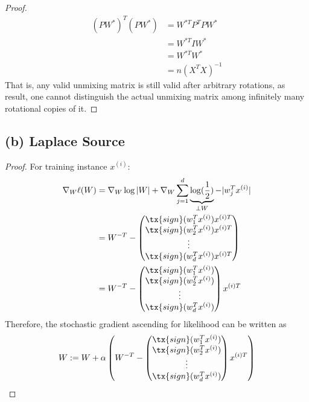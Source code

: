 \documentclass[11pt]{article}
\newcommand{\upi}[0]{^{(i)}}
\begin{document}
\begin{proof}
		\begin{align}
			(P W^*)^T (P W^*) &= W^{*T} P^T P W^* \\
			&= W^{*T} I W^* \\
			&= W^{*T} W^* \\
			&= n \left(X^T X\right)^{-1}
		\end{align}
		That is, any valid unmixing matrix is still valid after arbitrary rotations, as result, one cannot distinguish the actual unmixing matrix among infinitely many rotational copies of it.
	\end{proof}
	
	\newpage
	\subsection{(b) Laplace Source}
	\begin{proof}
		For training instance $x\upi$:
		\begin{align}
			\nabla_W \ell(W) &= \nabla_W \log |W| + \nabla_W \sum_{j=1}^d\underbrace{\log(\frac{1}{2})}_{\perp W} - |w_j^T x\upi| \\
			&= W^{-T} - 
			\begin{pmatrix}
				\tx{sign}(w_1^T x\upi) x^{(i)T} \\
				\tx{sign}(w_2^T x\upi) x^{(i)T} \\
				\vdots \\
				\tx{sign}(w_d^T x\upi) x^{(i)T}
			\end{pmatrix} \\
			&= W^{-T} - 
			\begin{pmatrix}
				\tx{sign}(w_1^T x\upi) \\
				\tx{sign}(w_2^T x\upi) \\
				\vdots \\
				\tx{sign}(w_d^T x\upi)
			\end{pmatrix} x^{(i)T}
		\end{align}
		Therefore, the stochastic gradient ascending for likelihood can be written as 
		\begin{align}
			W := W + \alpha \left (
				W^{-T} - 
			\begin{pmatrix}
				\tx{sign}(w_1^T x\upi) \\
				\tx{sign}(w_2^T x\upi) \\
				\vdots \\
				\tx{sign}(w_d^T x\upi)
			\end{pmatrix} x^{(i)T}
			\right )
		\end{align}  
	\end{proof}
	
\end{document}
